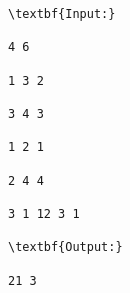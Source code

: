 \begin{verbatim}
\textbf{Input:}

4 6

1 3 2

3 4 3

1 2 1

2 4 4

3 1 12 3 1 

\textbf{Output:}

21 3\end{verbatim}